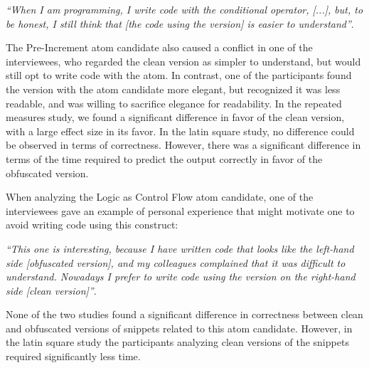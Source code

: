 \begin{mq}
\emph{``When I am programming, I write code with the conditional operator, [...], but, to be honest, I still think that 
[the code using the \rhs version] 
is easier to understand''}.
\end{mq}



The Pre-Increment atom candidate also caused a
conflict in one of the interviewees, who
regarded the clean version as simpler to understand, but would still opt to write
code with the atom. In contrast, %
one of the participants found the version with the atom candidate more elegant, but recognized it was less readable, and was willing to sacrifice elegance for readability. In the repeated measures study, we found a significant difference in favor of the clean version, with a large effect size in its favor. In the latin square study, no difference could be observed in terms of correctness. However, there was a significant difference in terms of the time required to predict the output correctly in favor of the obfuscated version. 

When analyzing the Logic as Control Flow atom candidate, one of the interviewees gave an example of personal experience that might motivate one to avoid writing code using this construct:

\begin{mq}
  \emph{``This one is interesting, because I have written code that looks like the left-hand side [obfuscated version], and my colleagues complained that it was difficult to understand. Nowadays I prefer to write code using the version on the right-hand side [clean version]''}.
\end{mq}
\noindent
None of the two studies found a significant difference in correctness between clean and obfuscated versions of snippets related to this atom candidate. However, in the latin square study the participants analyzing clean versions of the snippets required significantly less time. 


